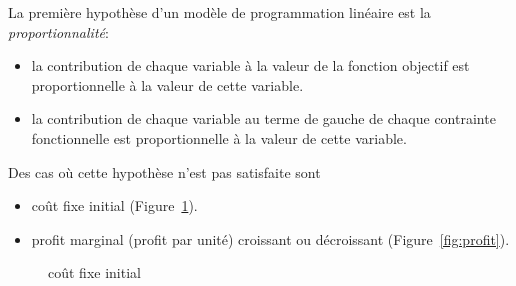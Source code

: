 La première hypothèse d'un modèle de programmation linéaire est la {\sl proportionnalité}:
\begin{itemize}
\item
la contribution de chaque variable à la valeur de la fonction objectif est proportionnelle à la valeur de cette variable.
\item
la contribution de chaque variable au terme de gauche de chaque contrainte fonctionnelle est proportionnelle à la valeur de cette variable.
\end{itemize}
Des cas où cette hypothèse n'est pas satisfaite sont
\begin{itemize}
\item
coût fixe initial (Figure~\ref{fig:initial_cost}).
\item
profit marginal (profit par unité) croissant ou décroissant (Figure~\ref{fig:profit}).
\end{itemize}
\begin{figure}[htbp]
\begin{center}
\end{center}
\caption{coût fixe initial}
\label{fig:initial_cost}
\end{figure}

